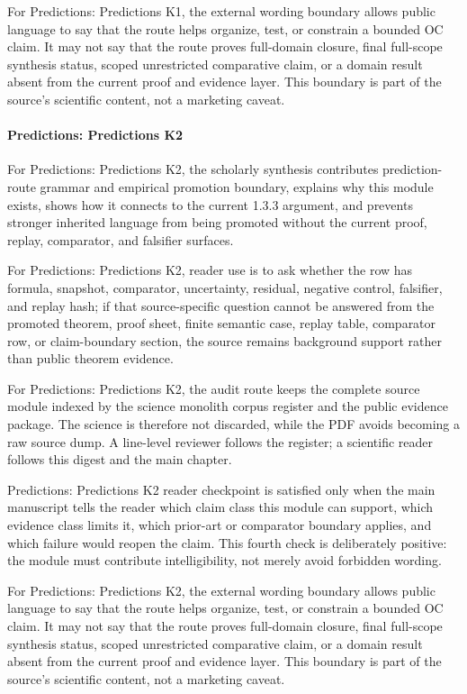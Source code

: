 For Predictions: Predictions K1, the external wording boundary allows public language to say that the route helps organize, test, or constrain a bounded OC claim. It may not say that the route proves full-domain closure, final full-scope synthesis status, scoped unrestricted comparative claim, or a domain result absent from the current proof and evidence layer. This boundary is part of the source's scientific content, not a marketing caveat.


\paragraph{Predictions: Predictions K2}

For Predictions: Predictions K2, the scholarly synthesis contributes prediction-route grammar and empirical promotion boundary, explains why this module exists, shows how it connects to the current 1.3.3 argument, and prevents stronger inherited language from being promoted without the current proof, replay, comparator, and falsifier surfaces.


For Predictions: Predictions K2, reader use is to ask whether the row has formula, snapshot, comparator, uncertainty, residual, negative control, falsifier, and replay hash; if that source-specific question cannot be answered from the promoted theorem, proof sheet, finite semantic case, replay table, comparator row, or claim-boundary section, the source remains background support rather than public theorem evidence.


For Predictions: Predictions K2, the audit route keeps the complete source module indexed by the science monolith corpus register and the public evidence package. The science is therefore not discarded, while the PDF avoids becoming a raw source dump. A line-level reviewer follows the register; a scientific reader follows this digest and the main chapter.


Predictions: Predictions K2 reader checkpoint is satisfied only when the main manuscript tells the reader which claim class this module can support, which evidence class limits it, which prior-art or comparator boundary applies, and which failure would reopen the claim. This fourth check is deliberately positive: the module must contribute intelligibility, not merely avoid forbidden wording.


For Predictions: Predictions K2, the external wording boundary allows public language to say that the route helps organize, test, or constrain a bounded OC claim. It may not say that the route proves full-domain closure, final full-scope synthesis status, scoped unrestricted comparative claim, or a domain result absent from the current proof and evidence layer. This boundary is part of the source's scientific content, not a marketing caveat.


